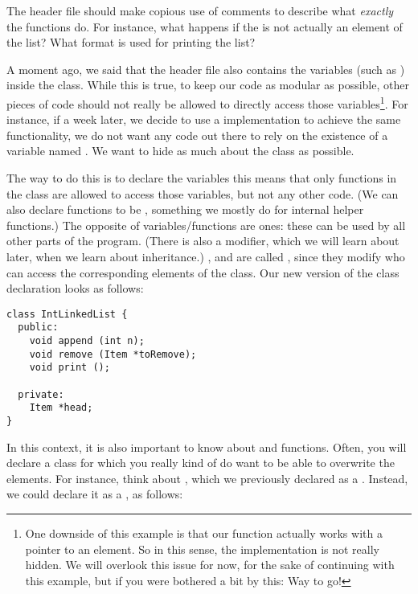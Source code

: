 The header file should make copious use of comments to describe what
\emph{exactly} the functions do. For instance, what happens if the
 is not actually an element of the list?
What format is used for printing the list?

A moment ago, we said that the header file also contains the variables
(such as ) inside the class. While this is true, to keep our
code as modular as possible, other pieces of code should not really be
allowed to directly access those variables\footnote{One downside of
  this example is that our  function actually works with
  a pointer to an element. So in this sense, the implementation is not
  really hidden. We will overlook this issue for now, for the sake
  of continuing with this example, but if you were bothered a bit by
  this: Way to go!}.
For instance, if a week later, we decide to use a 
implementation to achieve the same functionality,
we do not want any code out there to rely on the existence of a variable named . 
We want to hide as much about the class as possible.

The way to do this is to declare the variables 
this means that only functions in the class are allowed to access
those variables, but not any other code. 
(We can also declare functions to be ,
something we mostly do for internal helper functions.)
The opposite of  variables/functions are 
ones: these can be used by all other parts of the
program. (There is also a  modifier, which we
  will learn about later, when we learn about inheritance.)
, and  are called , since they modify who can access the corresponding
elements of the class.
Our new version of the class declaration looks as follows:

\begin{verbatim}
class IntLinkedList {
  public:
    void append (int n);
    void remove (Item *toRemove);
    void print ();
  
  private:
    Item *head;
}
\end{verbatim}

In this context, it is also important to know about  and
 functions. Often, you will declare a class for which you
really kind of do want to be able to overwrite the elements.
For instance, think about ,
which we previously declared as a .
Instead, we could declare it as a , as follows:

